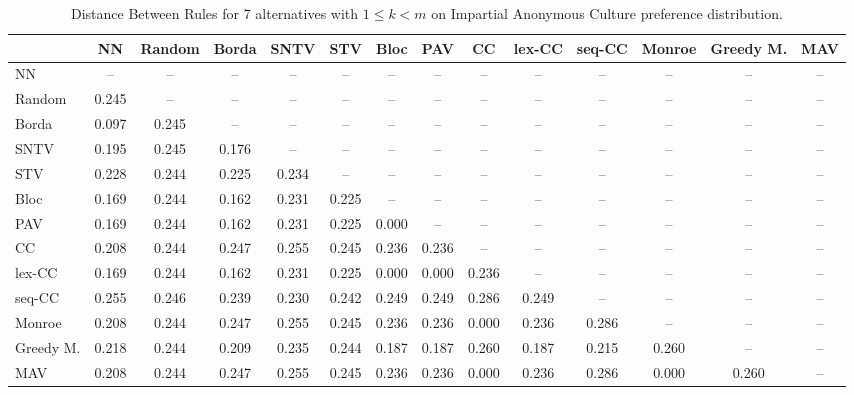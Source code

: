 
\begin{table*}
\centering
\begin{tabular}{lccccccccccccc}
\toprule
 & NN & Random & Borda & SNTV & STV & Bloc & PAV & CC & lex-CC & seq-CC & Monroe & Greedy M. & MAV \\
\midrule
NN & -- & -- & -- & -- & -- & -- & -- & -- & -- & -- & -- & -- & -- \\
Random & 0.245 & -- & -- & -- & -- & -- & -- & -- & -- & -- & -- & -- & -- \\
Borda & 0.097 & 0.245 & -- & -- & -- & -- & -- & -- & -- & -- & -- & -- & -- \\
SNTV & 0.195 & 0.245 & 0.176 & -- & -- & -- & -- & -- & -- & -- & -- & -- & -- \\
STV & 0.228 & 0.244 & 0.225 & 0.234 & -- & -- & -- & -- & -- & -- & -- & -- & -- \\
Bloc & 0.169 & 0.244 & 0.162 & 0.231 & 0.225 & -- & -- & -- & -- & -- & -- & -- & -- \\
PAV & 0.169 & 0.244 & 0.162 & 0.231 & 0.225 & 0.000 & -- & -- & -- & -- & -- & -- & -- \\
CC & 0.208 & 0.244 & 0.247 & 0.255 & 0.245 & 0.236 & 0.236 & -- & -- & -- & -- & -- & -- \\
lex-CC & 0.169 & 0.244 & 0.162 & 0.231 & 0.225 & 0.000 & 0.000 & 0.236 & -- & -- & -- & -- & -- \\
seq-CC & 0.255 & 0.246 & 0.239 & 0.230 & 0.242 & 0.249 & 0.249 & 0.286 & 0.249 & -- & -- & -- & -- \\
Monroe & 0.208 & 0.244 & 0.247 & 0.255 & 0.245 & 0.236 & 0.236 & 0.000 & 0.236 & 0.286 & -- & -- & -- \\
Greedy M. & 0.218 & 0.244 & 0.209 & 0.235 & 0.244 & 0.187 & 0.187 & 0.260 & 0.187 & 0.215 & 0.260 & -- & -- \\
MAV & 0.208 & 0.244 & 0.247 & 0.255 & 0.245 & 0.236 & 0.236 & 0.000 & 0.236 & 0.286 & 0.000 & 0.260 & -- \\
\bottomrule
\end{tabular}

\caption{Distance Between Rules for 7 alternatives with $1 \leq k < m$ on Impartial Anonymous Culture preference distribution.}
\end{table*}
